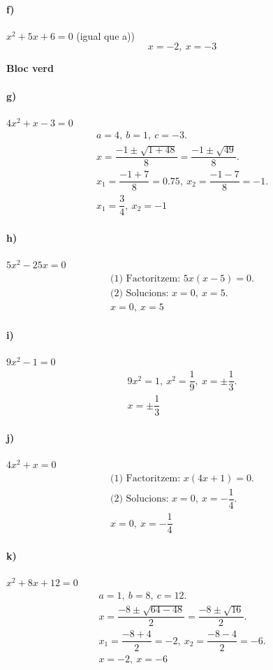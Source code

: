 \documentclass[11pt,a4paper]{article}
\begin{document}
\paragraph{f)} $x^2 + 5x + 6 = 0$ (igual que a))
\[
\boxed{x=-2,\ x=-3}
\]

\textbf{Bloc verd}

\paragraph{g)} $4x^2 + x - 3 = 0$
\[
\begin{aligned}
a=4,\ b=1,\ c=-3. \\
x=\dfrac{-1\pm\sqrt{1+48}}{8}=\dfrac{-1\pm\sqrt{49}}{8}. \\
x_1=\dfrac{-1+7}{8}=0.75,\ x_2=\dfrac{-1-7}{8}=-1. \\
\boxed{x_1=\dfrac{3}{4},\ x_2=-1}
\end{aligned}
\]

\paragraph{h)} $5x^2 - 25x = 0$
\[
\begin{aligned}
\text{(1) Factoritzem: } 5x(x-5)=0. \\
\text{(2) Solucions: } x=0,\ x=5. \\
\boxed{x=0,\ x=5}
\end{aligned}
\]

\paragraph{i)} $9x^2 - 1 = 0$
\[
\begin{aligned}
9x^2=1,\ x^2=\dfrac{1}{9},\ x=\pm\dfrac{1}{3}. \\
\boxed{x=\pm\dfrac{1}{3}}
\end{aligned}
\]

\paragraph{j)} $4x^2 + x = 0$
\[
\begin{aligned}
\text{(1) Factoritzem: } x(4x+1)=0. \\
\text{(2) Solucions: } x=0,\ x=-\dfrac{1}{4}. \\
\boxed{x=0,\ x=-\dfrac{1}{4}}
\end{aligned}
\]

\paragraph{k)} $x^2 + 8x + 12 = 0$
\[
\begin{aligned}
a=1,\ b=8,\ c=12. \\
x=\dfrac{-8\pm\sqrt{64-48}}{2}=\dfrac{-8\pm\sqrt{16}}{2}. \\
x_1=\dfrac{-8+4}{2}=-2,\ x_2=\dfrac{-8-4}{2}=-6. \\
\boxed{x=-2,\ x=-6}
\end{aligned}
\]
\end{document}
